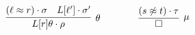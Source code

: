 
\begin{gather*}
    \infer[\theta]
        {L[r]\theta\cdot\rho}
        {(\ell\mEQ r)\cdot\sigma & L[\ell']\cdot\sigma'}
        \qquad\qquad
        \infer[\mu]
        {\emptyclause}
        {(s\mNE t)\cdot\tau}
\end{gather*}